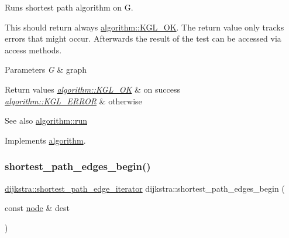 Runs shortest path algorithm on {\ttfamily G}. 

This should return always \mbox{\hyperlink{classalgorithm_af1a0078e153aa99c24f9bdf0d97f6710aae4c1cd7fe8d8cf4b143241a6e7c31cf}{algorithm\+::\+K\+G\+L\+\_\+\+OK}}. The return value only tracks errors that might occur. Afterwards the result of the test can be accessed via access methods.


\begin{DoxyParams}{Parameters}
{\em G} & graph\\
\hline
\end{DoxyParams}

\begin{DoxyRetVals}{Return values}
{\em \mbox{\hyperlink{classalgorithm_af1a0078e153aa99c24f9bdf0d97f6710aae4c1cd7fe8d8cf4b143241a6e7c31cf}{algorithm\+::\+K\+G\+L\+\_\+\+OK}}} & on success \\
\hline
{\em \mbox{\hyperlink{classalgorithm_af1a0078e153aa99c24f9bdf0d97f6710ae67bf27b2ef31f73e545a7f9f4a69556}{algorithm\+::\+K\+G\+L\+\_\+\+E\+R\+R\+OR}}} & otherwise\\
\hline
\end{DoxyRetVals}
\begin{DoxySeeAlso}{See also}
\mbox{\hyperlink{classalgorithm_a482eb28cacba018b5a86d3a819a50a2f}{algorithm\+::run}} 
\end{DoxySeeAlso}


Implements \mbox{\hyperlink{classalgorithm_a482eb28cacba018b5a86d3a819a50a2f}{algorithm}}.

\mbox{\label{classdijkstra_ad7ef6f747b68f8951322b265844dbb8a}} 
\subsubsection{\texorpdfstring{shortest\+\_\+path\+\_\+edges\+\_\+begin()}{shortest\_path\_edges\_begin()}}
{\footnotesize\ttfamily \mbox{\hyperlink{classdijkstra_ad35d95d4ed7a4202a5d048a63aa115b9}{dijkstra\+::shortest\+\_\+path\+\_\+edge\+\_\+iterator}} dijkstra\+::shortest\+\_\+path\+\_\+edges\+\_\+begin (\begin{DoxyParamCaption}\item[{const \mbox{\hyperlink{classnode}{node}} \&}]{dest }\end{DoxyParamCaption})}



